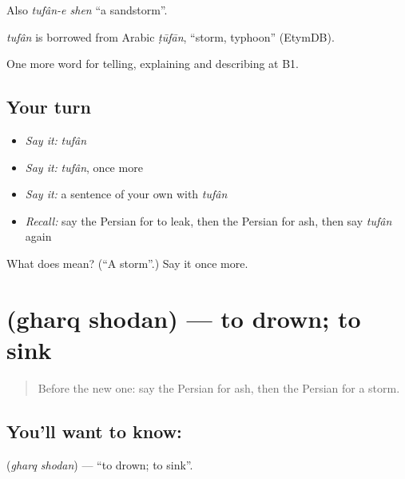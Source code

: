 Also \emph{tufân-e shen} \textquotedblleft{}a sandstorm\textquotedblright{}.

\begin{cousinweb}
\emph{tufân} is borrowed from Arabic \emph{ṭūfān}, \textquotedblleft{}storm, typhoon\textquotedblright{} (EtymDB).
\end{cousinweb}

\begin{grammarlens}[title={What you've built}]
One more word for telling, explaining and describing at B1.
\end{grammarlens}

\subsection*{Your turn}
\begin{itemize}
\raggedright
  \item \emph{Say it:} \emph{tufân}
  \item \emph{Say it:} \emph{tufân}, once more
  \item \emph{Say it:} a sentence of your own with \emph{tufân}
  \item \emph{Recall:} say the Persian for to leak, then the Persian for ash, then say \emph{tufân} again
\end{itemize}

\begin{tcolorbox}[breakable,colback=teal!4,colframe=teal!35!black,title={Before you move on}]
What does  mean? (\textquotedblleft{}A storm\textquotedblright{}.) Say it once more.
\end{tcolorbox}
\section[\texorpdfstring{\fa{غرق} \fa{شدن} (gharq shodan)}{غرق شدن (gharq shodan)}]{  (gharq shodan) — to drown; to sink}

\label{lesson:FA-C330-gharq-shodan}



\begin{quote}
Before the new one: say the Persian for ash, then the Persian for a storm.
\end{quote}

\subsection*{You'll want to know:  }
\textbf{ } (\emph{gharq shodan}) — \textquotedblleft{}to drown; to sink\textquotedblright{}.


